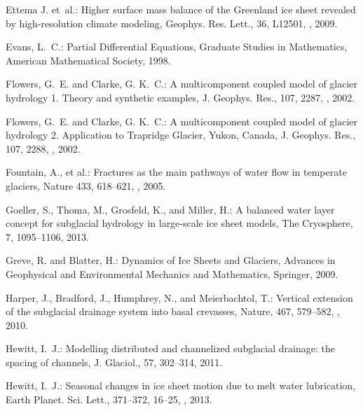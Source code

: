 \documentclass[gmd]{copernicus}   %
\begin{document}
\begin{thebibliography}{67}
Ettema J. et~al.: Higher surface mass balance of the Greenland ice sheet
  revealed by high-resolution climate modeling, Geophys. Res. Lett., 36, L12501,
  , 2009.

Evans, L.~C.: Partial {D}ifferential {E}quations, Graduate Studies in
  Mathematics, American Mathematical Society, 1998.

Flowers, G.~E. and Clarke, G. K.~C.: A multicomponent coupled model of glacier
  hydrology 1. {T}heory and synthetic examples, J. Geophys. Res., 107, 2287,
  , 2002{}.

Flowers, G.~E. and Clarke, G. K.~C.: A multicomponent coupled model of glacier
  hydrology 2. {A}pplication to {T}rapridge {G}lacier, {Y}ukon, {C}anada, J.
  Geophys. Res., 107, 2288, , 2002{}.

Fountain, A., et al.: Fractures as the main pathways of water flow in temperate glaciers, Nature 433, 618--621, , 2005.

Goeller, S., Thoma, M., Grosfeld, K., and Miller, H.: A balanced water layer
  concept for subglacial hydrology in large-scale ice sheet models, The
  Cryosphere, 7, 1095--1106, 2013.

Greve, R. and Blatter, H.: Dynamics of {I}ce {S}heets and {G}laciers, Advances
  in Geophysical and Environmental Mechanics and Mathematics, Springer, 2009.

Harper, J., Bradford, J., Humphrey, N., and Meierbachtol, T.: Vertical
  extension of the subglacial drainage system into basal crevasses, Nature,
  467, 579--582, , 2010.

Hewitt, I.~J.: Modelling distributed and channelized subglacial drainage: the
  spacing of channels, J. Glaciol., 57, 302--314, 2011.

Hewitt, I.~J.: Seasonal changes in ice sheet motion due to melt water
  lubrication, Earth Planet. Sci. Lett., 371--372, 16--25,
  , 2013.


\end{thebibliography}
\end{document}
